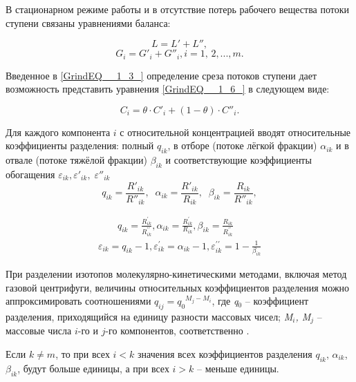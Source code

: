 В стационарном режиме работы и в отсутствие потерь рабочего вещества потоки ступени связаны уравнениями баланса:

\begin{equation} \label{GrindEQ__1_5_} 
  L=L'+L'', 
  \end{equation} 
  \begin{equation} \label{GrindEQ__1_6_} 
  G_{i} =G'_{i} + G''_{i} , i=1,\, 2,...,m.             
\end{equation} 
  
Введенное в \ref{GrindEQ__1_3_} определение среза потоков ступени дает возможность представить уравнения \ref{GrindEQ__1_6_} в следующем виде:

\begin{equation} \label{GrindEQ__1_7_} 
  C_{i} =\theta  \cdot C'_{i} +(1-\theta ) \cdot C''_{i} . 
\end{equation} 

Для каждого компонента $i$ с относительной концентрацией вводят относительные коэффициенты разделения: полный $q_{ik}$, в отборе (потоке лёгкой фракции) $\alpha _{ik} $ и в отвале (потоке тяжёлой фракции) $\beta _{ik} $ и соответствующие коэффициенты обогащения $\varepsilon _{ik} ,\varepsilon '_{ik} ,\; \varepsilon ''_{ik} \; $
\[q_{ik} =\frac{R'_{ik} }{R''_{ik} } ,\; \; \alpha _{ik} =\frac{R'_{ik} }{R_{ik} } ,\; \; \beta _{ik} =\frac{R_{ik} }{R''_{ik} } ,\] 

\begin{equation} \label{GrindEQ__1_11_} 
  \begin{array}{l}
    \qquad q_{i k}=\frac{R_{i k}^{\prime}}{R_{i k}^{\prime \prime}}, \alpha_{i k}=\frac{R_{i k}^{\prime}}{R_{i k}}, \beta_{i k}=\frac{R_{i k}}{R_{i k}^{\prime \prime}} \\
    \varepsilon_{i k}=q_{i k}-1, \varepsilon_{i k}^{\prime}=\alpha_{i k}-1, \varepsilon_{i k}^{\prime \prime}=1-\frac{1}{\beta_{i k}}
    \end{array}
\end{equation} 

При разделении изотопов молекулярно-кинетическими методами, включая метод газовой центрифуги, величины относительных коэффициентов разделения можно аппроксимировать соотношениями $q_{ij} =q_{0} {}^{M_{j} -M_{i} }$, где \textit{q}${}_{0}$ -- коэффициент разделения, приходящийся на единицу разности массовых чисел; \textit{M${}_{i}$, M${}_{j}$} – массовые числа $i$-го и $j$-го компонентов, соответственно \cite{sulaberidzeTeoriyaKaskadovDlya2011}.

Если $k\ne m$, то при всех $i<k$ значения всех коэффициентов разделения $q_{ik} $, $\alpha _{ik} $, $\beta _{ik} $, будут больше единицы, а при всех $i>k$ -- меньше единицы.

